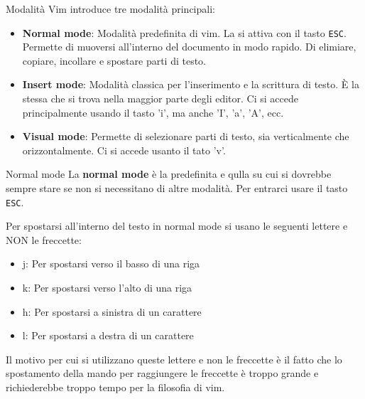 \documentclass{beamer}
\begin{document}
\begin{frame}{Modalità}
  Vim introduce tre modalità principali:
  \begin{itemize}[<+->]
    \item \textbf{Normal mode}: Modalità predefinita di vim. La si attiva con 
      il tasto \texttt{ESC}. Permette di muoversi all'interno del documento in 
      modo rapido. Di elimiare, copiare, incollare e spostare parti di testo.

    \item \textbf{Insert mode}: Modalità classica per l'inserimento e la 
      scrittura di testo. È la stessa che si trova nella maggior parte degli 
      editor. Ci si accede principalmente usando il tasto 'i', ma anche 'I', 
      'a', 'A', ecc.

    \item \textbf{Visual mode}: Permette di selezionare parti di testo, sia 
      verticalmente che orizzontalmente. Ci si accede usanto il tato 'v'.
  \end{itemize}
\end{frame}

\begin{frame}{Normal mode}
  La \textbf{normal mode} è la predefinita e qulla su cui si dovrebbe sempre 
  stare se non si necessitano di altre modalità. Per entrarci usare il tasto
  \texttt{ESC}. \medskip

  Per spostarsi all'interno del testo in normal mode si usano le seguenti 
  lettere e NON le freccette:
  \begin{itemize}
    \item j: Per spostarsi verso il basso di una riga
    \item k: Per spostarsi verso l'alto di una riga
    \item h: Per spostarsi a sinistra di un carattere
    \item l: Per spostarsi a destra di un carattere
  \end{itemize}
  Il motivo per cui si utilizzano queste lettere e non le freccette è il fatto 
  che lo spostamento della mando per raggiungere le freccette è troppo grande
  e richiederebbe troppo tempo per la filosofia di vim.
\end{frame}
\end{document}
